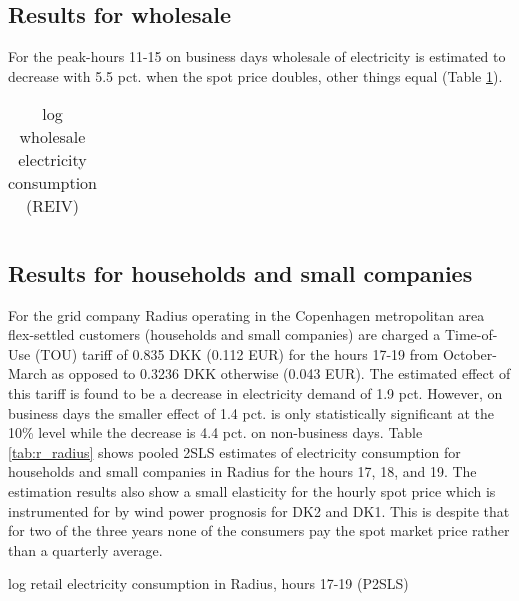 \label{sec:results}
\subsection{Results for wholesale}
\label{subsec:r_wholesale}
For the peak-hours 11-15 on business days wholesale of electricity is estimated to decrease with 5.5 pct. when the spot price doubles, other things equal (Table \ref{tab:ws_preferred}).
\begin{table}[H]
  \vspace{-0.0cm}
  \centering
  \caption{log wholesale electricity consumption (REIV)}
  \footnotesize
    \begin{tabular}{lcccc}
      \toprule
        
    \end{tabular}
  \label{tab:ws_preferred}
  \vspace{-0.0cm}
\end{table}


\subsection{Results for households and small companies}
\label{subsec:r_households}
For the grid company Radius operating in the Copenhagen metropolitan area flex-settled customers (households and small companies) are charged a Time-of-Use (TOU) tariff of 0.835 DKK (0.112 EUR) for the hours 17-19 from October-March as opposed to 0.3236 DKK otherwise (0.043 EUR). The estimated effect of this tariff is found to be a decrease in electricity demand of 1.9 pct. However, on business days the smaller effect of 1.4 pct. is only statistically significant at the 10\% level while the decrease is 4.4 pct. on non-business days. Table \ref{tab:r_radius} shows pooled 2SLS estimates of electricity consumption for households and small companies in Radius for the hours 17, 18, and 19. The estimation results also show a small elasticity for the hourly spot price which is instrumented for by wind power prognosis for DK2 and DK1. This is despite that for two of the three years none of the consumers pay the spot market price rather than a quarterly average.
\begin{table}[H]
  \vspace{-0.0cm}
  \centering
  \caption{log retail electricity consumption in Radius, hours 17-19 (P2SLS)}
  \footnotesize
        
  \label{tab:r_radius}
  \vspace{-0.0cm}
\end{table}


